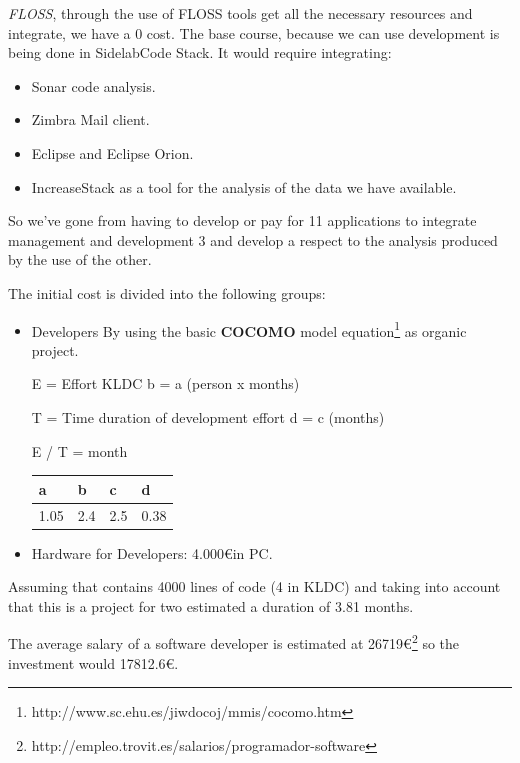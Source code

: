 \documentclass[11pt]{scrartcl}
\begin{document}
\par \emph{FLOSS}, through the use of FLOSS tools get all the necessary resources and integrate, we have a 0 cost. The base course, because we can use development is being done in SidelabCode Stack. It would require integrating:

\begin{itemize}
    \item Sonar code analysis.
    \item Zimbra Mail client.
    \item Eclipse and Eclipse Orion.
    \item IncreaseStack as a tool for the analysis of the data we have available.
\end{itemize}

\par So we've gone from having to develop or pay for 11 applications to integrate management and development 3 and develop a respect to the analysis produced by the use of the other.

\par The initial cost is divided into the following groups:

\begin{itemize}
    \item Developers
     By using the basic \textbf{COCOMO} model equation\footnote{http://www.sc.ehu.es/jiwdocoj/mmis/cocomo.htm}  as organic project.

    E = Effort KLDC b = a (person x months)
    
    T = Time duration of development effort d = c (months)
    
    E / T = month

    \begin{table}[H]
        \centering
        \begin{tabular}{|l|l|l|l|}
            \hline a & b & c & d\\
            \hline 1.05 & 2.4 & 2.5 & 0.38\\
            \hline
        \end{tabular}
    \end{table}

    \item Hardware for Developers: 4.000\euro in PC.
\end{itemize}

\par Assuming that contains 4000 lines of code (4 in KLDC) and taking into account that this is a project for two estimated a duration of 3.81 months.
\par The average salary of a software developer is estimated at 26719\euro\footnote{http://empleo.trovit.es/salarios/programador-software} so the investment would 17812.6\euro.
    
\end{document}
